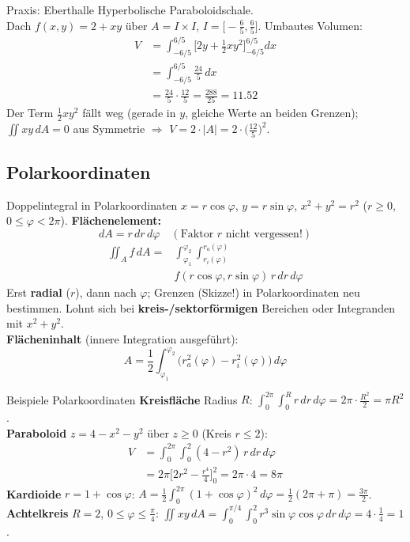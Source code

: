 \documentclass[a4paper, fontsize=7pt]{scrartcl}
\begin{document}
\begin{subbox}{Praxis: Eberthalle}
Hyperbolische Paraboloidschale.\\
Dach $f(x, y) = 2 + xy$ über $A = I \times I$,
$I = \big[-\frac65, \frac65\big]$. Umbautes Volumen:
\begin{align*}
V &= \int_{-6/5}^{6/5} \Big[2y + \tfrac12 x y^2\Big]_{-6/5}^{6/5} dx\\
  &= \int_{-6/5}^{6/5} \tfrac{24}{5}\, dx\\
  &= \tfrac{24}{5} \cdot \tfrac{12}{5} = \tfrac{288}{25}
   = \mathbf{11.52}
\end{align*}
Der Term $\frac12 x y^2$ fällt weg (gerade in $y$, gleiche Werte an
beiden Grenzen); $\iint xy\,dA = 0$ aus Symmetrie $\Rightarrow$
$V = 2 \cdot |A| = 2 \cdot \big(\frac{12}{5}\big)^2$.
\end{subbox}

\subsection{Polarkoordinaten}

\begin{mainbox}{Doppelintegral in Polarkoordinaten}
$x = r\cos\varphi$, $y = r\sin\varphi$, $x^2 + y^2 = r^2$
($r \ge 0$, $0 \le \varphi < 2\pi$).
\textbf{Flächenelement:}
$$dA = r\, dr\, d\varphi \quad (\text{Faktor } r \text{ nicht vergessen!})$$
\begin{align*}
\iint_A f\, dA = &\int_{\varphi_1}^{\varphi_2}
  \int_{r_i(\varphi)}^{r_a(\varphi)}\\
  &f(r\cos\varphi, r\sin\varphi)\, r\, dr\, d\varphi
\end{align*}
Erst \textbf{radial} ($r$), dann nach $\varphi$; Grenzen (Skizze!) in
Polarkoordinaten neu bestimmen.
Lohnt sich bei \textbf{kreis-/sektorförmigen} Bereichen oder Integranden
mit $x^2 + y^2$.\\[2pt]
\textbf{Flächeninhalt} (innere Integration ausgeführt):
$$A = \frac12 \int_{\varphi_1}^{\varphi_2} \big(r_a^2(\varphi)
- r_i^2(\varphi)\big)\, d\varphi$$
\end{mainbox}

\begin{subbox}{Beispiele Polarkoordinaten}
\textbf{Kreisfläche} Radius $R$:
$\int_0^{2\pi} \int_0^R r\, dr\, d\varphi = 2\pi \cdot \frac{R^2}{2}
= \pi R^2$.\\[2pt]
\textbf{Paraboloid} $z = 4 - x^2 - y^2$ über $z \ge 0$ (Kreis $r \le 2$):
\begin{align*}
V &= \int_0^{2\pi} \int_0^2 (4 - r^2)\, r\, dr\, d\varphi\\
  &= 2\pi \Big[2r^2 - \tfrac{r^4}{4}\Big]_0^2 = 2\pi \cdot 4 = 8\pi
\end{align*}
\textbf{Kardioide} $r = 1 + \cos\varphi$:
$A = \frac12 \int_0^{2\pi} (1 + \cos\varphi)^2\, d\varphi
= \frac12 (2\pi + \pi) = \frac{3\pi}{2}$.\\[2pt]
\textbf{Achtelkreis} $R = 2$, $0 \le \varphi \le \frac\pi4$:
$\iint xy\, dA = \int_0^{\pi/4} \int_0^2 r^3 \sin\varphi\cos\varphi\,
dr\, d\varphi = 4 \cdot \frac14 = 1$.
\end{subbox}
\end{document}

